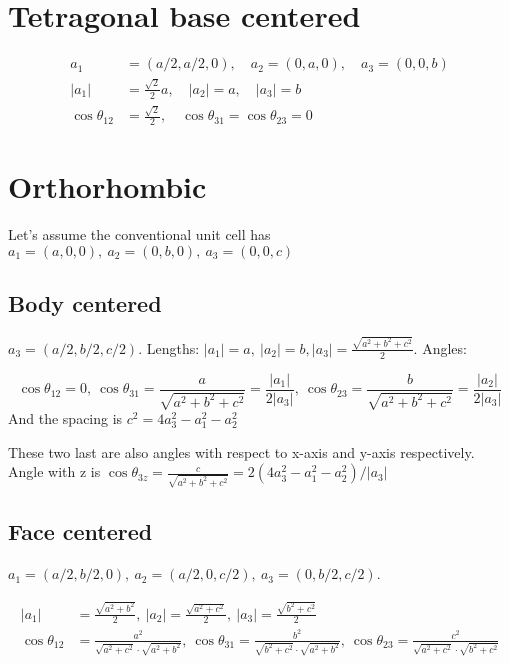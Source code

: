 \documentclass[a4paper,10pt]{article} 	%
\numberwithin{equation}{section}
\begin{document}
	\section{Tetragonal base centered}
	\begin{align}
		a_1 &= (a/2,a/2,0), \quad a_2 = (0,a,0), \quad a_3 = (0,0,b) \\
		|a_1| &= \frac{\sqrt{2}}{2} a, \quad |a_2| = a, \quad |a_3| = b \\
		\cos \theta_{12} &= \frac{\sqrt{2}}{2}, \quad \cos \theta_{31} = \cos\theta_{23} = 0
	\end{align}
	
	\section{Orthorhombic}
	Let's assume the conventional unit cell has $a_1 = (a,0,0),\ a_2 = (0,b,0),\ a_3 = (0,0,c)$
	
	\subsection{Body centered}
	$a_3 = (a/2, b/2, c/2)$. Lengths: $|a_1| = a,\ |a_2| = b, |a_3| = \frac{\sqrt{a^2+b^2+c^2}}{2}$. Angles: 
	
	\begin{equation}
		\cos \theta_{12} = 0,\ \cos \theta_{31} = \frac{a}{\sqrt{a^2+b^2+c^2}} = \frac{|a_1|}{2|a_3|},\ \cos \theta_{23} = \frac{b}{\sqrt{a^2+b^2+c^2}} = \frac{|a_2|}{2|a_3|}
	\end{equation}
	And the spacing is $ c^2 = 4a_3^2-a_1^2-a_2^2 $
	
	These two last are also angles with respect to x-axis and y-axis respectively. Angle with z is $\cos\theta_{3z} = \frac{c}{\sqrt{a^2+b^2+c^2}} = 2(4a_3^2-a_1^2-a_2^2)/|a_3|$
	
	\subsection{Face centered}
	$ a_1 = (a/2,b/2,0), \ a_2 = (a/2,0,c/2), \ a_3 = (0,b/2,c/2) $.
	
	\begin{align} 
	|a_1| &= \frac{\sqrt{a^2+b^2}}{2}, \ |a_2| = \frac{\sqrt{a^2+c^2}}{2}, \ |a_3| = \frac{\sqrt{b^2+c^2}}{2} \\
	\cos \theta_{12} &= \frac{a^2}{\sqrt{a^2+c^2} \cdot \sqrt{a^2+b^2}},\ \cos \theta_{31} = \frac{b^2}{\sqrt{b^2+c^2} \cdot \sqrt{a^2+b^2}},\ \cos \theta_{23} = \frac{c^2}{\sqrt{a^2+c^2} \cdot \sqrt{b^2+c^2}} 
	\end{align}
	
\end{document}
